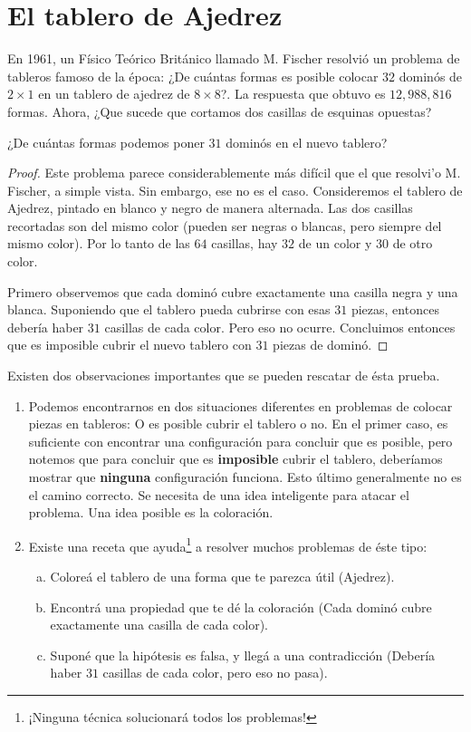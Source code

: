 \section{El tablero de Ajedrez}

En 1961, un F\'isico Te\'orico Brit\'anico llamado M. Fischer resolvi\'o un problema de tableros famoso de la \'epoca: ¿De cu\'antas formas es posible colocar $32$ domin\'os de $2\times 1$ en un tablero de ajedrez de $8\times 8$?. La respuesta que obtuvo es $12,988,816$ formas. 
Ahora, ¿Que sucede que cortamos dos casillas de esquinas opuestas?

\begin{ejem}
	 ¿De cu\'antas formas podemos poner $31$ domin\'os en el nuevo tablero?
\end{ejem}
\begin{proof}
	Este problema parece considerablemente m\'as dif\'icil que el que resolvi'o M. Fischer, a simple vista. Sin embargo, ese no es el caso. Consideremos el tablero de Ajedrez, pintado en blanco y negro de manera alternada. Las dos casillas recortadas son del mismo color (pueden ser negras o blancas, pero siempre del mismo color). Por lo tanto de las $64$ casillas, hay $32$ de un color y $30$ de otro color. 
	
	Primero observemos que cada domin\'o cubre exactamente una casilla negra y una blanca. Suponiendo que el tablero pueda cubrirse con esas $31$ piezas, entonces deber\'ia haber $31$ casillas de cada color. Pero eso no ocurre. Concluimos entonces que es imposible cubrir el nuevo tablero con $31$ piezas de domin\'o. 
\end{proof}
 

Existen dos observaciones importantes que se pueden rescatar de \'esta prueba. 
\begin{enumerate}
	\item Podemos encontrarnos en dos situaciones diferentes en problemas de colocar piezas en tableros: O es posible cubrir el tablero o no. En el primer caso, es suficiente con encontrar una configuraci\'on para concluir que es posible, pero notemos que para concluir que es \textbf{imposible} cubrir el tablero, deber\'iamos mostrar que \textbf{ninguna} configuraci\'on funciona. Esto \'ultimo generalmente no es el camino correcto. Se necesita de una idea inteligente para atacar el problema. Una idea posible es la coloraci\'on.
	\item Existe una receta que ayuda\footnote{¡Ninguna t\'ecnica solucionar\'a todos los problemas!} a resolver muchos problemas de \'este tipo:
	\begin{enumerate}[a.]
		\item Colore\'a el tablero de una forma que te parezca \'util (Ajedrez). %
		\item Encontr\'a una propiedad que te d\'e la coloraci\'on (Cada domin\'o cubre exactamente una casilla de cada color). 
		\item Supon\'e que la hip\'otesis es falsa, y lleg\'a a una contradicci\'on (Deber\'ia haber $31$ casillas de cada color, pero eso no pasa).
	\end{enumerate}

	
	
\end{enumerate}

